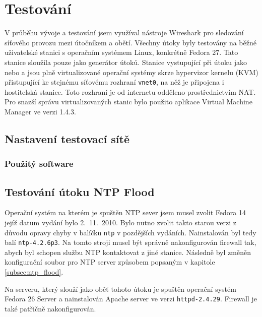 \chapter{Testování}
\label{chap:testovani}
V průběhu vývoje a testování jsem využíval nástroje Wireshark pro sledování síťového provozu mezi útočníkem a obětí. Všechny útoky byly testovány na běžné uživatelské stanici s operačním systémem Linux, konkrétně Fedora 27. Tato stanice sloužila pouze jako generátor útoků. Stanice vystupující při útoku jako  nebo  a  jsou plně virtualizované operační systémy skrze hypervizor kernelu (KVM) přistupující ke stejnému síťovému rozhraní \texttt{vnet0}, na něž je připojena i hostitelská stanice. Toto rozhraní je od internetu odděleno prostřednictvím NAT. Pro snazší správu virtualizovaných stanic bylo použito aplikace Virtual Machine Manager ve verzi 1.4.3.

\section{Nastavení testovací sítě}
%
%
%
%
\subsection{Použitý software} %


\section{Testování útoku NTP Flood}
Operační systém na kterém je spuštěn NTP sever jsem musel zvolit Fedora 14 jejíž datum vydání bylo 2.\ 11.\ 2010. Bylo nutno zvolit takto starou verzi z důvodu opravy chyby v balíčku \texttt{ntp} v pozdějších vydáních. Nainstalován byl tedy balí \texttt{ntp-4.2.6p3}. Na tomto stroji musel být správně nakonfigurován firewall tak, abych byl schopen službu NTP kontaktovat z jiné stanice. Následně byl změněn konfigurační soubor pro NTP server způsobem popsaným v kapitole \ref{subsec:ntp_flood}.

Na serveru, který slouží jako oběť tohoto útoku je spuštěn operační systém Fedora 26 Server a nainstalován Apache server ve verzi \texttt{httpd-2.4.29}. Firewall je také patřičně nakonfigurován.

